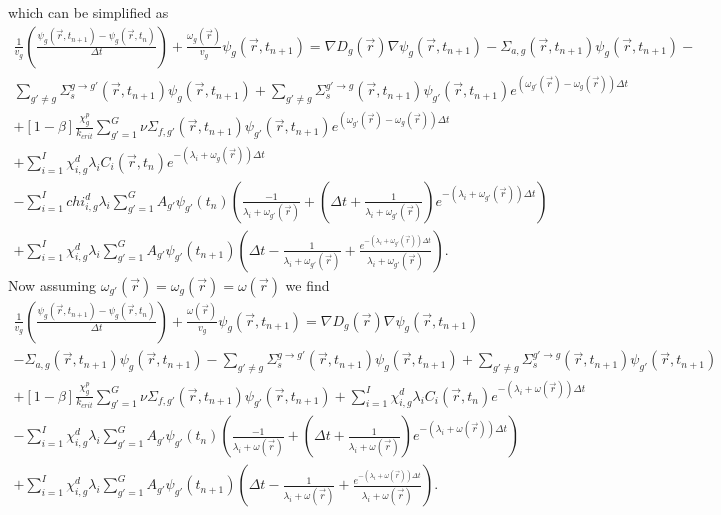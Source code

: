 \documentclass[12pt]{report}
\begin{document}
	which can be simplified as
	\begin{eqnarray}
	\frac{1}{v_g} \left(\frac{\psi_g(\vec{r},t_{n+1}) - \psi_g(\vec{r},t_{n})}{\Delta t} \right) + \frac{\omega_g(\vec{r})}{v_g} \psi_g(\vec{r},t_{n+1})  = \nabla D_g(\vec{r}) \nabla \psi_g(\vec{r},t_{n+1}) - \Sigma_{a,g}(\vec{r},t_{n+1}) \psi_g(\vec{r},t_{n+1}) -  \nonumber \\ \sum_{g'\neq g} \Sigma_{s}^{g\rightarrow g'} (\vec{r},t_{n+1}) \psi_g(\vec{r},t_{n+1}) + \sum_{g' \neq g} \Sigma_{s}^{g'\rightarrow g} (\vec{r},t_{n+1}) \psi_{g'}(\vec{r},t_{n+1}) e^{\left(\omega_{g'}(\vec{r}) - \omega_{g}(\vec{r}) \right) \Delta t} \nonumber \\
	+ \left[ 1- \beta \right] \frac{\chi_g^p}{k_{crit}} \sum_{g'=1}^{G} \nu \Sigma_{f,g'}(\vec{r},t_{n+1}) \psi_{g'}(\vec{r},t_{n+1}) e^{\left(\omega_{g'}(\vec{r}) - \omega_{g}(\vec{r}) \right) \Delta t} \nonumber \\ +  \sum_{i=1}^{I} \chi_{i,g}^d \lambda_i C_i(\vec{r},t_{n}) e^{-\left(\lambda_i + \omega_g(\vec{r})\right) \Delta t} \nonumber \\
	- \sum_{i=1}^{I} chi_{i,g}^d \lambda_i \sum_{g'=1}^{G} A_{g'} \psi_{g'}(t_n) \left( \frac{-1}{\lambda_i + \omega_{g'}(\vec{r})} + \left(\Delta t + \frac{1}{\lambda_i + \omega_{g'}(\vec{r})} \right)e^{-\left(\lambda_i + \omega_{g'}(\vec{r}) \right) \Delta t} \right) \nonumber \\
	+ \sum_{i=1}^{I} \chi_{i,g}^d \lambda_i \sum_{g'=1}^{G} A_{g'} \psi_{g'}(t_{n+1}) \left( \Delta t - \frac{1}{\lambda_i + \omega_{g'}(\vec{r})} + \frac{e^{-\left( \lambda_i + \omega_{g'}(\vec{r}) \right) \Delta t}}{\lambda_i + \omega_{g'}(\vec{r})} \right)
	\nonumber.
	\end{eqnarray}
	Now assuming $\omega_{g'}(\vec{r}) = \omega_g(\vec{r}) = \omega(\vec{r})$ we find
	\begin{eqnarray}
	\frac{1}{v_g} \left(\frac{\psi_g(\vec{r},t_{n+1}) - \psi_g(\vec{r},t_{n})}{\Delta t} \right) + \frac{\omega(\vec{r})}{v_g} \psi_g(\vec{r},t_{n+1})  = \nabla D_g(\vec{r}) \nabla \psi_g(\vec{r},t_{n+1}) \nonumber \\ - \Sigma_{a,g}(\vec{r},t_{n+1}) \psi_g(\vec{r},t_{n+1}) -   \sum_{g'\neq g} \Sigma_{s}^{g\rightarrow g'} (\vec{r},t_{n+1}) \psi_g(\vec{r},t_{n+1}) + \sum_{g' \neq g} \Sigma_{s}^{g'\rightarrow g} (\vec{r},t_{n+1}) \psi_{g'}(\vec{r},t_{n+1}) \nonumber \\
	+ \left[ 1- \beta \right] \frac{\chi_g^p}{k_{crit}} \sum_{g'=1}^{G} \nu \Sigma_{f,g'}(\vec{r},t_{n+1}) \psi_{g'}(\vec{r},t_{n+1})  +  \sum_{i=1}^{I} \chi_{i,g}^d \lambda_i C_i(\vec{r},t_{n}) e^{-\left(\lambda_i + \omega(\vec{r})\right) \Delta t} \nonumber \\
	- \sum_{i=1}^{I} \chi_{i,g}^d \lambda_i \sum_{g'=1}^{G} A_{g'} \psi_{g'}(t_n) \left( \frac{-1}{\lambda_i + \omega(\vec{r})} + \left(\Delta t + \frac{1}{\lambda_i + \omega(\vec{r})} \right)e^{-\left(\lambda_i + \omega(\vec{r}) \right) \Delta t} \right) \nonumber \\
	+ \sum_{i=1}^{I} \chi_{i,g}^d \lambda_i \sum_{g'=1}^{G} A_{g'} \psi_{g'}(t_{n+1}) \left( \Delta t - \frac{1}{\lambda_i + \omega(\vec{r})} + \frac{e^{-\left( \lambda_i + \omega(\vec{r}) \right) \Delta t}}{\lambda_i + \omega(\vec{r})}\right)
	\nonumber.
	\end{eqnarray}
\end{document}
